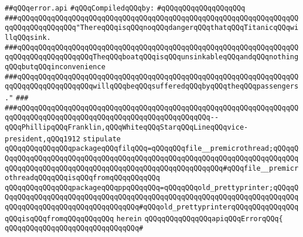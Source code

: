 \label{src/lib/c-kit/src/parser/stuff/error.api}
\verb|##qQQqerror.api|\newline
\newline
\verb|#qQQqCompiledqQQqby:|\newline
\verb|#qQQqqQQqqQQqqQQqqQQq|\newline
\newline
\verb|###qQQqqQQqqQQqqQQqqQQqqQQqqQQqqQQqqQQqqQQqqQQqqQQqqQQqqQQqqQQqqQQqqQQqqQQqqQQqqQQqqQQq"ThereqQQqisqQQqnoqQQqdangerqQQqthatqQQqTitanicqQQqwillqQQqsink.|\newline
\verb|###qQQqqQQqqQQqqQQqqQQqqQQqqQQqqQQqqQQqqQQqqQQqqQQqqQQqqQQqqQQqqQQqqQQqqQQqqQQqqQQqqQQqqQQqTheqQQqboatqQQqisqQQqunsinkableqQQqandqQQqnothingqQQqbutqQQqinconvenience|\newline
\verb|###qQQqqQQqqQQqqQQqqQQqqQQqqQQqqQQqqQQqqQQqqQQqqQQqqQQqqQQqqQQqqQQqqQQqqQQqqQQqqQQqqQQqqQQqwillqQQqbeqQQqsufferedqQQqbyqQQqtheqQQqpassengers."|\newline
\verb|###|\newline
\verb|###qQQqqQQqqQQqqQQqqQQqqQQqqQQqqQQqqQQqqQQqqQQqqQQqqQQqqQQqqQQqqQQqqQQqqQQqqQQqqQQqqQQqqQQqqQQqqQQqqQQqqQQqqQQqqQQqqQQq--qQQqPhillipqQQqFranklin,qQQqWhiteqQQqStarqQQqLineqQQqvice-president,qQQq1912|\newline
\newline
\newline
\verb|stipulate|\newline
\verb|qQQqqQQqqQQqqQQqpackageqQQqfilqQQq=qQQqqQQqfile__premicrothread;qQQqqQQqqQQqqQQqqQQqqQQqqQQqqQQqqQQqqQQqqQQqqQQqqQQqqQQqqQQqqQQqqQQqqQQqqQQqqQQqqQQqqQQqqQQqqQQqqQQqqQQqqQQqqQQqqQQqqQQqqQQqqQQq#qQQqfile__premicrothreadqQQqqQQqisqQQqfromqQQqqQQqqQQq|\newline
\verb|qQQqqQQqqQQqqQQqpackageqQQqppqQQqqQQq=qQQqqQQqold_prettyprinter;qQQqqQQqqQQqqQQqqQQqqQQqqQQqqQQqqQQqqQQqqQQqqQQqqQQqqQQqqQQqqQQqqQQqqQQqqQQqqQQqqQQqqQQqqQQqqQQqqQQqqQQqqQQq#qQQqold_prettyprinterqQQqqQQqqQQqqQQqqQQqisqQQqfromqQQqqQQqqQQq|\newline
\verb|herein|\newline
\newline
\verb|qQQqqQQqqQQqqQQqapiqQQqErrorqQQq{|\newline
\verb|qQQqqQQqqQQqqQQqqQQqqQQqqQQqqQQq#|\newline
